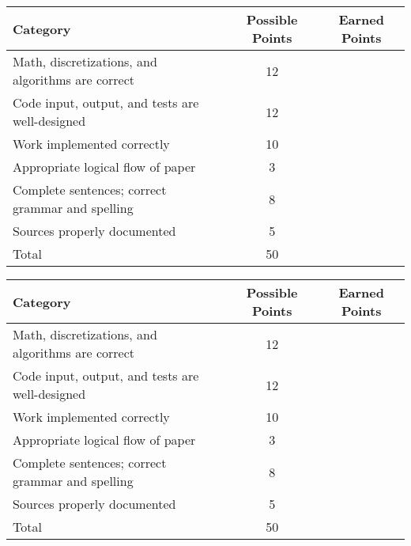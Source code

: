 \documentclass[a4paper, 12 pt]{curve}
\begin{document}
\renewcommand{\arraystretch}{2}

\begin{center}
\begin{tabu}{| X | c | c |}\hline
\textbf{Category} & \textbf{Possible Points} & \textbf{Earned Points} \\ \hline \hline
Math, discretizations, and algorithms are correct & 12 & \\ \hline
Code input, output, and tests are well-designed & 12 & \\ \hline
Work implemented correctly & 10 & \\ \hline
Appropriate logical flow of paper & 3 & \\ \hline
Complete sentences; correct grammar and spelling & 8 & \\ \hline
Sources properly documented & 5 & \\ \hline
Total & 50 & \\\hline
\end{tabu} 
\end{center}

\vspace{8em}
\begin{center}
\begin{tabu}{| X | c | c |}\hline
\textbf{Category} & \textbf{Possible Points} & \textbf{Earned Points} \\ \hline \hline
Math, discretizations, and algorithms are correct & 12 & \\ \hline
Code input, output, and tests are well-designed & 12 & \\ \hline
Work implemented correctly & 10 & \\ \hline
Appropriate logical flow of paper & 3 & \\ \hline
Complete sentences; correct grammar and spelling & 8 & \\ \hline
Sources properly documented & 5 & \\ \hline
Total & 50 & \\\hline
\end{tabu} 
\end{center}
\end{document}

